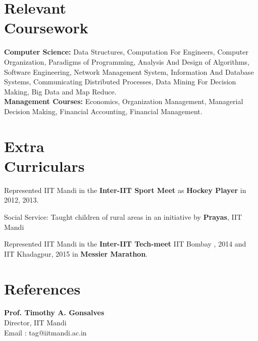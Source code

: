 \documentclass[a4paper,margin,line]{resume}
\begin{document}
\begin{resume}
	\section{\mysidestyle Relevant\\Coursework}
	\textbf{Computer Science:} Data Structures, Computation For Engineers, Computer Organization, Paradigms of Programming, Analysis And Design of Algorithms, Software Engineering, Network Management System, Information And Database Systems, Communicating Distributed Processes, Data Mining For Decision Making, Big Data and Map Reduce. \vspace{0.5mm}\\%
	\textbf{Management Courses:} Economics, Organization Management, Managerial Decision Making, Financial Accounting, Financial Management.
\section{\mysidestyle Extra\\Curriculars}

\begin{list2}
	\item Represented IIT Mandi in the \textbf{Inter-IIT Sport Meet} as \textbf{Hockey Player} in 2012, 2013.
	\item 	Social Service: Taught children of rural areas in an initiative by \textbf{Prayas}, IIT Mandi
	\item Represented IIT Mandi in the \textbf{Inter-IIT Tech-meet} IIT Bombay , 2014 and IIT Khadagpur, 2015 in \textbf{Messier Marathon}.
	\end{list2}

\section{\mysidestyle References}

	\textbf{Prof.  Timothy A. Gonsalves}\\
	Director, IIT Mandi\\
	Email :  tag@iitmandi.ac.in




\end{resume}
\end{document}
